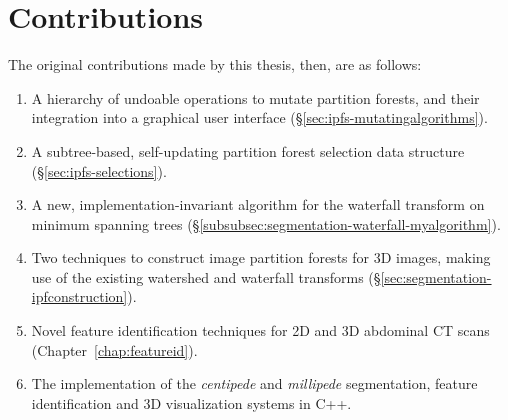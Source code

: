\vspace{-\baselineskip}
\enlargethispage*{\baselineskip}

\section*{Contributions}


The original contributions made by this thesis, then, are as follows:

\begin{enumerate}
\item A hierarchy of undoable operations to mutate partition forests, and their integration into a graphical user interface (\S\ref{sec:ipfs-mutatingalgorithms}).
\item A subtree-based, self-updating partition forest selection data structure (\S\ref{sec:ipfs-selections}).
\item A new, implementation-invariant algorithm for the waterfall transform on minimum spanning trees (\S\ref{subsubsec:segmentation-waterfall-myalgorithm}).
\item Two techniques to construct image partition forests for 3D images, making use of the existing watershed and waterfall transforms (\S\ref{sec:segmentation-ipfconstruction}).
\item Novel feature identification techniques for 2D and 3D abdominal CT scans (Chapter~\ref{chap:featureid}).
\item The implementation of the \emph{centipede} and \emph{millipede} segmentation, feature identification and 3D visualization systems in C++.
\end{enumerate}



